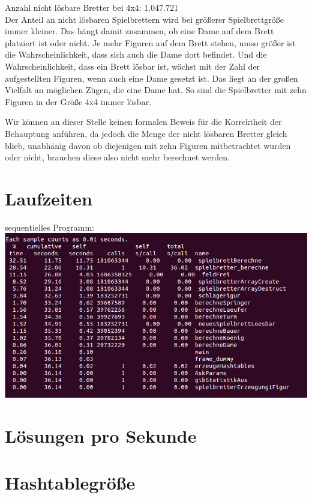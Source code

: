 \documentclass[
	12pt,
	a4paper,
	BCOR10mm,
	DIV14,
	listof=totoc,
	bibliography=totoc,
	headsepline
]{scrreprt}
\begin{document}
Anzahl nicht lösbare Bretter bei 4x4: 1.047.721\\

Der Anteil an nicht lösbaren Spielbrettern wird bei größerer Spielbrettgröße immer kleiner. Das hängt damit zusammen, ob eine Dame auf dem Brett platziert ist oder nicht. Je mehr Figuren auf dem Brett stehen, umso größer ist die Wahrscheinlichkeit, dass sich auch die Dame dort befindet. Und die Wahrscheinlichkeit, dass ein Brett lösbar ist, wächst mit der Zahl der aufgestellten Figuren, wenn auch eine Dame gesetzt ist. 
Das liegt an der großen Vielfalt an möglichen Zügen, die eine Dame hat.
So sind die Spielbretter mit zehn Figuren in der Größe 4x4 immer lösbar.

Wir können an dieser Stelle keinen formalen Beweis für die Korrektheit der Behauptung anführen, da jedoch die Menge der nicht lösbaren Bretter gleich blieb, unabhänig davon ob diejenigen mit zehn Figuren mitbetrachtet wurden oder nicht, brauchen diese also nicht mehr berechnet werden. 

\section{Laufzeiten}
sequentielles Programm:\\
\includegraphics[scale=0.6]{gprof}

\section{Lösungen pro Sekunde}

\section{Hashtablegröße}
\end{document}
